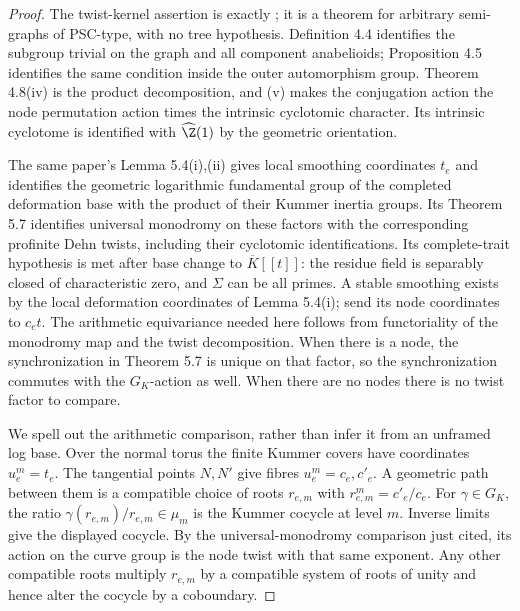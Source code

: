 \begin{proof}
The twist-kernel assertion is exactly \cite[Definition 4.4, Proposition 4.5, Theorem 4.8(iv),(v), and Proposition 4.10(ii), summarized as Theorem B]{HoshiMochizuki2012A567}; it is a theorem for arbitrary semi-graphs of PSC-type, with no tree hypothesis. Definition 4.4 identifies the subgroup trivial on the graph and all component anabelioids; Proposition 4.5 identifies the same condition inside the outer automorphism group. Theorem 4.8(iv) is the product decomposition, and (v) makes the conjugation action the node permutation action times the intrinsic cyclotomic character. Its intrinsic cyclotome is identified with $\widehat{\Z}(1)$ by the geometric orientation.

The same paper's Lemma 5.4(i),(ii) gives local smoothing coordinates $t_e$ and identifies the geometric logarithmic fundamental group of the completed deformation base with the product of their Kummer inertia groups. Its Theorem 5.7 identifies universal monodromy on these factors with the corresponding profinite Dehn twists, including their cyclotomic identifications. Its complete-trait hypothesis is met after base change to $\overline{K}[[t]]$: the residue field is separably closed of characteristic zero, and $\Sigma$ can be all primes. A stable smoothing exists by the local deformation coordinates of Lemma 5.4(i); send its node coordinates to $c_et$. The arithmetic equivariance needed here follows from functoriality of the monodromy map and the twist decomposition. When there is a node, the synchronization in Theorem 5.7 is unique on that factor, so the synchronization commutes with the $G_K$-action as well. When there are no nodes there is no twist factor to compare.

We spell out the arithmetic comparison, rather than infer it from an unframed log base. Over the normal torus the finite Kummer covers have coordinates $u_e^m=t_e$. The tangential points $N,N'$ give fibres $u_e^m=c_e,c'_e$. A geometric path between them is a compatible choice of roots $r_{e,m}$ with
$r_{e,m}^m=c'_e/c_e$. For $\gamma\in G_K$, the ratio
$\gamma(r_{e,m})/r_{e,m}\in\mu_m$ is the Kummer cocycle at level $m$. Inverse limits give the displayed cocycle. By the universal-monodromy comparison just cited, its action on the curve group is the node twist with that same exponent. Any other compatible roots multiply $r_{e,m}$ by a compatible system of roots of unity and hence alter the cocycle by a coboundary.


\end{proof}
